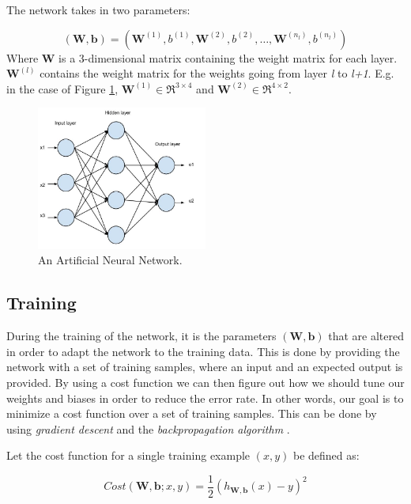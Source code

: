 The network takes in two parameters: 

\begin{equation}
	(\mathbf{W, b}) = (\mathbf{W}^{(1)}, b^{(1)}, \mathbf{W}^{(2)}, b^{(2)}, \dots , \mathbf{W}^{(n_l)}, b^{(n_l)})	
\end{equation}
 Where \textbf{W} is a 3-dimensional matrix containing the weight matrix for each layer. $ \mathbf{W}^{(l)} $ contains the weight matrix for the weights going from layer \textit{l} to \textit{l+1}. E.g. in the case of Figure \ref{fig_ann}, $ \mathbf{W}^{(1)} \in \Re ^{3 \times 4}$ and $ \mathbf{W}^{(2)} \in \Re ^{4 \times 2}$.

\begin{figure}[h!]
  \centering
      \includegraphics[width=0.5\textwidth]{Figures/Background/ann}
  \caption{An Artificial Neural Network.}
  \label{fig_ann}
\end{figure}


\subsection{Training} \label{sec_ann_training}
During the training of the network, it is the parameters $ (\mathbf{W, b}) $ that are altered in order to adapt the network to the training data. This is done by providing the network with a set of training samples, where an input and an expected output is provided. By using a cost function we can then figure out how we should tune our weights and biases in order to reduce the error rate. In other words, our goal is to minimize a cost function over a set of training samples. This can be done by using \textit{gradient descent} and the \textit{backpropagation algorithm} \cite{Rumelhart1986}\cite{Leonard1990}\cite{LeCun1998}. 

Let the cost function for a single training example $(x,y)$ be defined as:

\begin{equation}
	Cost(\mathbf{W},\mathbf{b}; x, y) = \frac{1}{2}(h_{\mathbf{W},\mathbf{b}}(x) - y)^2
\end{equation}

